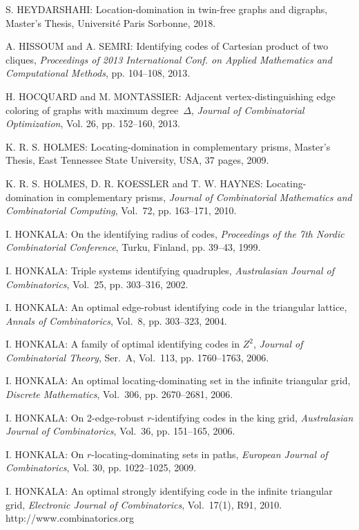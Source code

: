 \begin{thebibliography}{999}
S. HEYDARSHAHI: Location-domination in twin-free graphs and digraphs, Master's Thesis, Universit\'e Paris Sorbonne, 2018.

A. HISSOUM and A. SEMRI: Identifying codes of Cartesian product of two cliques, {\it Proceedings of 2013 International Conf. on Applied Mathematics and Computational Methods}, pp. 104--108, 2013.

H. HOCQUARD and M. MONTASSIER: Adjacent vertex-distinguishing edge coloring of graphs with maximum degree~$\Delta$, {\it Journal of Combinatorial Optimization}, Vol. 26, pp. 152--160, 2013.

K. R. S. HOLMES: Locating-domination in complementary prisms, Master's Thesis, East Tennessee State University, USA, 37 pages, 2009.

K. R. S. HOLMES, D. R. KOESSLER and T. W. HAYNES: Locating-domination in
complementary prisms, {\it Journal of Combinatorial Mathematics and Combinatorial
Computing}, Vol.~72, pp. 163--171, 2010.

I. HONKALA: On the identifying radius of codes, {\it Proceedings of the 7th Nordic Combinatorial Conference}, Turku, Finland, pp. 39--43, 1999.

I. HONKALA: Triple systems identifying quadruples, {\it Australasian Journal of Combinatorics}, Vol.~25, pp. 303--316, 2002.

I. HONKALA: An optimal edge-robust identifying code in the triangular lattice, {\it Annals of Combinatorics}, Vol.~8, pp. 303--323, 2004.

I. HONKALA: A family of optimal identifying codes in $Z^2$, {\it Journal of Combinatorial Theory}, Ser.~A, Vol.~113, pp. 1760--1763, 2006.

I. HONKALA: An optimal locating-dominating set in the infinite triangular grid, {\it Discrete Mathematics}, Vol.~306, pp. 2670--2681, 2006.

I. HONKALA: On 2-edge-robust $r$-identifying codes in the king grid, {\it Australasian Journal of Combinatorics}, Vol.~36, pp. 151--165, 2006.

I. HONKALA: On $r$-locating-dominating sets in paths, {\it European Journal of Combinatorics}, Vol. 30, pp. 1022--1025, 2009. 

I. HONKALA: An optimal strongly identifying code in the infinite triangular grid, {\it Electronic Journal of Combinatorics}, Vol.~17(1), R91, 2010.\\
http://www.combinatorics.org


\end{thebibliography}
